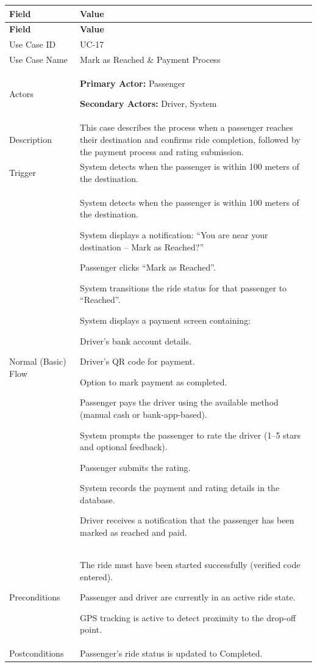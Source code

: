 \begin{longtable}{|p{3.5cm}|p{12cm}|}
\hline
\rowcolor{lightgray!30}
\textbf{Field} & \textbf{Value} \\
\hline
\endfirsthead
\hline
\rowcolor{lightgray!30}
\textbf{Field} & \textbf{Value} \\
\hline
\endhead
\hline
\endfoot
Use Case ID & UC-17 \\
\hline
Use Case Name & Mark as Reached \& Payment Process \\
\hline
Actors &
\textbf{Primary Actor:} Passenger

\textbf{Secondary Actors:} Driver, System \\
\hline
Description &
This case describes the process when a passenger reaches their destination and confirms ride completion, followed by the payment process and rating submission. \\
\hline
Trigger &
System detects when the passenger is within 100 meters of the destination. \\
\hline
Normal (Basic) Flow &
System detects when the passenger is within 100 meters of the destination.

System displays a notification: “You are near your destination – Mark as Reached?”

Passenger clicks “Mark as Reached”.

System transitions the ride status for that passenger to “Reached”.

System displays a payment screen containing:

Driver’s bank account details.

Driver’s QR code for payment.

Option to mark payment as completed.

Passenger pays the driver using the available method (manual cash or bank-app-based).

System prompts the passenger to rate the driver (1–5 stars and optional feedback).

Passenger submits the rating.

System records the payment and rating details in the database.

Driver receives a notification that the passenger has been marked as reached and paid. \\
\hline
Preconditions &
The ride must have been started successfully (verified code entered).

Passenger and driver are currently in an active ride state.

GPS tracking is active to detect proximity to the drop-off point. \\
\hline
Postconditions &
Passenger’s ride status is updated to Completed.


\end{longtable}
